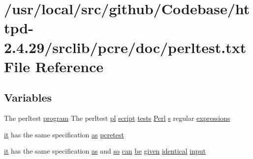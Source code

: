 \hypertarget{perltest_8txt}{}\section{/usr/local/src/github/\+Codebase/httpd-\/2.4.29/srclib/pcre/doc/perltest.txt File Reference}
\label{perltest_8txt}
\subsection*{Variables}
\begin{DoxyCompactItemize}
\item 
The perltest \hyperlink{pcretest_8txt_a48917cf15a1089461e55bc56de9a58c3}{program} The perltest \hyperlink{perltest_8txt_a841c59daab01e1f609fdd4547afbe6e6}{pl} \hyperlink{basic-configuration_8txt_ac1048f198f179d52eda77c5ed6ab9ba9}{script} \hyperlink{running-developer-tests_8txt_ae0edb32d329db43bf8a0513c0967e5b9}{tests} \hyperlink{pcre_8txt_ab4ce39be83e35c074153e23755e6b420}{Perl} \hyperlink{pcretest_8txt_a062597889ba244b72877454b1d3adecf}{s} regular \hyperlink{perltest_8txt_a7df68229a6e0e55982138713459bcfb2}{expressions}
\item 
\hyperlink{pcretest_8txt_ab977b64dbdb969ce031dc4281a792b3c}{it} has the same specification \hyperlink{pcretest_8txt_a7681723cb91eaa99771ee87f8465c1aa}{as} \hyperlink{perltest_8txt_ad7e2e1cbcf5aed569f45ce5270eaf0d0}{pcretest}
\item 
\hyperlink{pcretest_8txt_ab977b64dbdb969ce031dc4281a792b3c}{it} has the same specification \hyperlink{pcretest_8txt_a7681723cb91eaa99771ee87f8465c1aa}{as} and \hyperlink{pcretest_8txt_a35e1c9bd1e24f3f31253ab761f792055}{so} \hyperlink{pcre_8txt_a2a892895a50bc58f3679c7acb58190e6}{can} \hyperlink{NON-AUTOTOOLS-BUILD_8txt_ac08ce70cbd4f453457597ad15ecbebdd}{be} \hyperlink{pcregrep_8txt_a9dffb3dde41716fc3bef8d0ee982f378}{given} \hyperlink{perltest_8txt_a679f8e28e8e7ea47aa69fdb4a13bd8ad}{identical} \hyperlink{perltest_8txt_a1d3f4df61ab6d72e9cfd2de361e2a85b}{input}
\item 

\end{DoxyCompactItemize}
